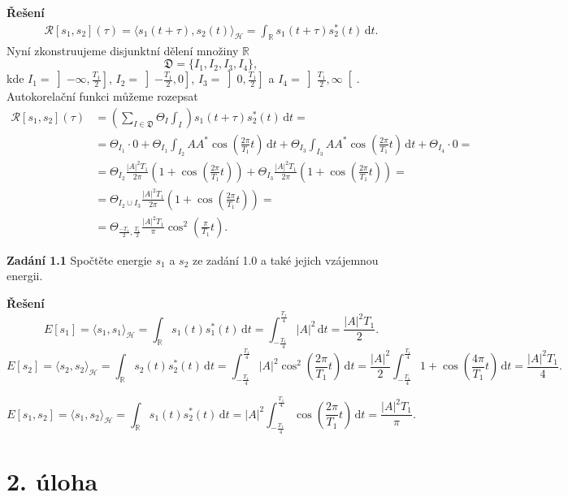\documentclass{article}
\begin{document}
\noindent \textbf{Řešení}
\begin{align*}
    \mathcal{R}[s_1, s_2](\tau) = \langle s_1(t + \tau), s_2(t)\rangle_{\mathcal{H}} = \int_{\mathbb{R}} s_1(t+\tau)s_2^{*}(t)\,\mathrm{d}t.
\end{align*}
Nyní zkonstruujeme disjunktní dělení množiny $\mathbb{R}$
\[
    \mathfrak{D} = \{I_1, I_2, I_3, I_4\},
\]
kde $I_1 = \left]-\infty, \frac{T_1}{2}\right]$, $I_2 = \left]-\frac{T_1}{2}, 0\right]$, $I_3 = \left]0, \frac{T_1}{2}\right]$ a $I_4 = \left]\frac{T_1}{2}, \infty\right[$. Autokorelační funkci můžeme rozepsat
\begin{align*}
    \mathcal{R}[s_1, s_2](\tau) &= \left(\sum_{I \in \mathfrak{D}} \Theta_{I} \int_{I}\right)s_1(t + \tau)s_2^{*}(t) \,\mathrm{d}t = \\ &= \Theta_{I_1} \cdot 0 + \Theta_{I_1} \int_{I_2} A A^{*} \cos\left(\frac{2 \pi}{T_1} t\right)\,\mathrm{d}t + \Theta_{I_3} \int_{I_3} A A^{*} \cos\left(\frac{2 \pi}{T_1} t\right)\,\mathrm{d}t + \Theta_{I_4} \cdot 0 = \\ &= \Theta_{I_2}\frac{|A|^2 T_1}{2\pi}\left(1 + \cos\left(\frac{2\pi}{T_1} t\right)\right) + \Theta_{I_3}\frac{|A|^2 T_1}{2\pi}\left(1 + \cos\left(\frac{2\pi}{T_1} t\right)\right) = \\ &= \Theta_{I_2\cup I_3} \frac{|A|^2 T_1}{2\pi}\left(1 + \cos\left(\frac{2\pi}{T_1} t\right)\right) = \\ &= \Theta_{\frac{-T_1}{2}, \frac{T_1}{2}} \frac{|A|^2 T_1}{\pi} \cos^2\left(\frac{\pi}{T_1}t \right).
\end{align*}

\vspace{0.5em}
\noindent \textbf{Zadání 1.1} Spočtěte energie $s_1$ a $s_2$ ze zadání 1.0 a také jejich vzájemnou energii.

\vspace{0.5em}
\noindent\textbf{Řešení}
\[
    E[s_1] = \langle s_1, s_1 \rangle_{\mathcal{H}} = \int_{\mathbb{R}}s_1(t) s_1^{*}(t)\,\mathrm{d}t = \int_{-\frac{T_1}{4}}^{\frac{T_1}{4}} |A|^2 \,\mathrm{d}t = \frac{|A|^2T_1}{2}.
\]
\[
    E[s_2] = \langle s_2, s_2 \rangle_{\mathcal{H}} = \int_{\mathbb{R}}s_2(t) s_2^{*}(t)\,\mathrm{d}t = \int_{-\frac{T_1}{4}}^{\frac{T_1}{4}} |A|^2 \cos^2\left(\frac{2\pi}{T_1} t \right) \,\mathrm{d}t = \frac{|A|^2}{2} \int_{-\frac{T_1}{4}}^{\frac{T_1}{4}} 1 + \cos\left(\frac{4\pi}{T_1}t \right)\,\mathrm{d}t = \frac{|A|^2T_1}{4}.
\]

\newpage

\[
    E[s_1, s_2] = \langle s_1, s_2 \rangle_{\mathcal{H}} = \int_{\mathbb{R}}s_1(t) s_2^{*}(t)\,\mathrm{d}t =|A|^2 \int_{-\frac{T_1}{4}}^{\frac{T_1}{4}} \cos\left( \frac{2\pi}{T_1}t\right)\,\mathrm{d}t = \frac{|A|^2T_1}{\pi}.
\]

\section*{2. úloha}
\end{document}
